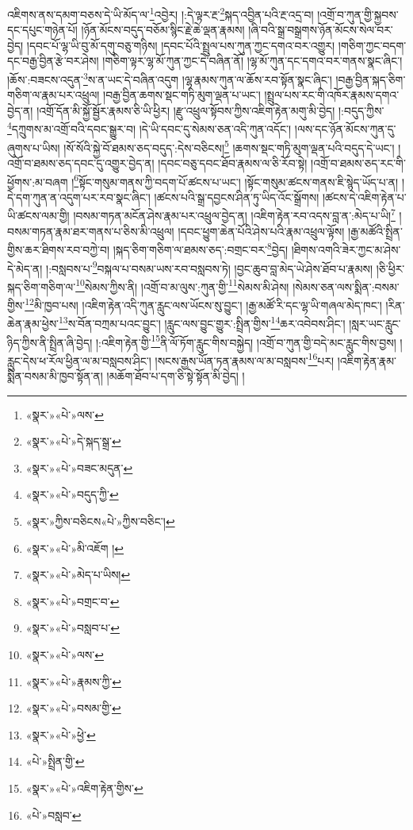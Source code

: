 འཇིགས་ནས་དམག་བཅས་དེ་ཡི་མོད་ལ་\footnote{«སྣར་»«པེ་»ལས་}འབྱེར། །:དེ་ལྟར་རྔ་\footnote{«སྣར་»«པེ་»དེ་སྐད་སྒྲ་}སྐད་འབྱིན་པའི་རྔ་འདྲ་བ། །འགྲོ་བ་ཀུན་གྱི་སྐྱབས་དང་དཔུང་གཉེན་པོ། །ཉོན་མོངས་བདུད་བཅོམ་སྙིང་རྗེ་ཆེ་ལྡན་རྣམས། །ཞི་བའི་སྒྲ་བསྒྲགས་ཉོན་མོངས་སེལ་བར་བྱེད། །དབང་པོ་ལྷ་ཡི་བུ་མོ་དགུ་བཅུ་གཉིས། །དབང་པོའི་སྤྲུལ་པས་ཀུན་ཀྱང་དགའ་བར་འགྱུར། །གཅིག་ཀྱང་བདག་དང་བརྒྱ་བྱིན་རྩེ་བར་ཤེས། །གཅིག་ལྟར་ལྷ་མོ་ཀུན་ཀྱང་དེ་བཞིན་ནོ། །ལྷ་མོ་ཀུན་དང་དགའ་བར་གནས་སྣང་ཞིང་། །ཆོས་:བཟངས་འདུན་\footnote{«སྣར་»«པེ་»བཟང་མདུན་}ས་ན་ཡང་དེ་བཞིན་འདུག །ལྷ་རྣམས་ཀུན་ལ་ཆོས་རབ་སྟོན་སྣང་ཞིང་། །བརྒྱ་བྱིན་སྐད་ཅིག་གཅིག་ལ་རྣམ་པར་འཕྲུལ། །བརྒྱ་བྱིན་ཆགས་སྡང་གཏི་མུག་ལྡན་པ་ཡང་། །སྤྲུལ་པས་རང་གི་འཁོར་རྣམས་དགའ་བྱེད་ན། །འགྲོ་དོན་མི་སྐྱོ་སྦྱོར་རྣམས་ཅི་ཡི་ཕྱིར། །རྫུ་འཕྲུལ་སྟོབས་ཀྱིས་འཇིག་རྟེན་མགུ་མི་བྱེད། །:བདུད་ཀྱིས་\footnote{«སྣར་»«པེ་»བདུད་ཀྱི་}དཀྲུགས་མ་འགྲོ་བའི་དབང་སྒྱུར་བ། །དེ་ཡི་དབང་དུ་སེམས་ཅན་འདི་ཀུན་འདོང་། །ལས་དང་ཉོན་མོངས་ཀུན་དུ་ཞུགས་པ་ཡིས། །སོ་སོའི་སྐྱེ་བོ་ཐམས་ཅད་བདུད་:དེས་བཅིངས།\footnote{«སྣར་»ཀྱིས་བཅིངས«པེ་»ཀྱིས་བཅིང་།} །ཆགས་སྡང་གཏི་མུག་ལྡན་པའི་བདུད་དེ་ཡང་། །འགྲོ་བ་ཐམས་ཅད་དབང་དུ་འགྱུར་བྱེད་ན། །དབང་བཅུ་དབང་ཐོབ་རྣམས་ལ་ཅི་རོབ་སྟེ། །འགྲོ་བ་ཐམས་ཅད་རང་གི་ཕྱོགས་:མ་བཞག །\footnote{«སྣར་»«པེ་»མི་འཇོག །}སྟོང་གསུམ་གནས་ཀྱི་བདག་པོ་ཚངས་པ་ཡང་། །སྟོང་གསུམ་ཚངས་གནས་ཇི་སྙེད་ཡོད་པ་ན། །དེ་དག་ཀུན་ན་འདུག་པར་རབ་སྣང་ཞིང་། །ཚངས་པའི་སྒྲ་དབྱངས་ཤིན་ཏུ་ཡིད་འོང་སྒྲོགས། །ཚངས་དེ་འཇིག་རྟེན་པ་ཡི་ཚངས་ལམ་གྱི། །བསམ་གཏན་མངོན་ཤེས་རྣམ་པར་འཕྲུལ་བྱེད་ན། །འཇིག་རྟེན་རབ་འདས་བླ་ན་:མེད་པ་ཡི།\footnote{«སྣར་»«པེ་»མེད་པ་ཡིས།} །བསམ་གཏན་རྣམ་ཐར་གནས་པ་ཅིས་མི་འཕྲུལ། །དབང་ཕྱུག་ཆེན་པོའི་ཤེས་པའི་རྣམ་འཕྲུལ་ལྟོས། །རྒྱ་མཚོའི་སྤྲིན་གྱིས་ཆར་ཐིགས་རབ་བཀྱེ་བ། །སྐད་ཅིག་གཅིག་ལ་ཐམས་ཅད་:བགྲང་བར་\footnote{«སྣར་»«པེ་»བགྲང་བ་}བྱེད། །ཐིགས་འགའི་ཟེར་ཀྱང་མ་ཤེས་དེ་མེད་ན། །:བསླབས་པ་\footnote{«སྣར་»«པེ་»བསླབ་པ་}བསྐལ་པ་བསམ་ཡས་རབ་བསླབས་ཏེ། །བྱང་ཆུབ་བླ་མེད་ཡེ་ཤེས་ཐོབ་པ་རྣམས། །ཅི་ཕྱིར་སྐད་ཅིག་གཅིག་ལ་\footnote{«སྣར་»«པེ་»ལས་}སེམས་ཀྱིས་ནི། །འགྲོ་བ་མ་ལུས་:ཀུན་གྱི་\footnote{«སྣར་»«པེ་»རྣམས་ཀྱི་}སེམས་མི་ཤེས། །སེམས་ཅན་ལས་སྨིན་:བསམ་གྱིས་\footnote{«སྣར་»«པེ་»བསམ་གྱི་}མི་ཁྱབ་པས། །འཇིག་རྟེན་འདི་ཀུན་རླུང་ལས་ཡོངས་སུ་བྱུང་། །རྒྱ་མཚོ་རི་དང་ལྷ་ཡི་གཞལ་མེད་ཁང་། །རིན་ཆེན་རྣམ་ཕྱེས་\footnote{«སྣར་»«པེ་»ཕྱེ་}ས་བོན་བཀྲམ་པའང་བྱུང་། །རླུང་ལས་བྱུང་གྱུར་:སྤྲིན་གྱིས་\footnote{«པེ་»སྤྲིན་གྱི་}ཆར་འབེབས་ཤིང་། །སླར་ཡང་རླུང་ཉིད་ཀྱིས་ནི་སྤྲིན་ཞི་བྱེད། །:འཇིག་རྟེན་གྱི་\footnote{«སྣར་»«པེ་»འཇིག་རྟེན་གྱིས་}ནི་ལོ་ཏོག་རླུང་གིས་བསྐྱེད། །འགྲོ་བ་ཀུན་གྱི་བདེ་མང་རླུང་གིས་བྱས། །རླུང་དེས་ཕ་རོལ་ཕྱིན་ལ་མ་བསླབས་ཤིང་། །སངས་རྒྱས་ཡོན་ཏན་རྣམས་ལ་མ་བསླབས་\footnote{«པེ་»བསླབ་}པར། །འཇིག་རྟེན་རྣམ་སྨིན་བསམ་མི་ཁྱབ་སྟོན་ན། །མཆོག་ཐོབ་པ་དག་ཅི་སྟེ་སྟོན་མི་བྱེད། །
